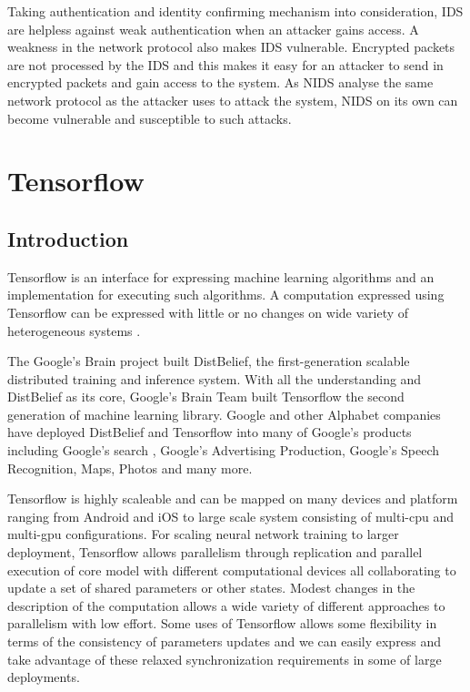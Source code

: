 \documentclass[12pt, a4paper]{report}
\begin{document}
Taking authentication and identity confirming mechanism into consideration, IDS are helpless against weak authentication when an attacker gains access. A weakness in the network protocol also makes IDS vulnerable. Encrypted packets are not processed by the IDS and this makes it easy for an attacker to send in encrypted packets and gain access to the system. As NIDS analyse the same network protocol as the attacker uses to attack the system, NIDS on its own can become vulnerable and susceptible to such attacks. \cite{limitationOfIDS}
\clearpage



\chapter{Tensorflow}\label{sec:tensorflow}

\section{Introduction}\label{sec:tensor_intro}
\justify
Tensorflow is an interface for expressing machine learning algorithms and an implementation for executing such algorithms. A computation expressed using Tensorflow can be expressed with little or no changes on wide variety of heterogeneous systems \cite{tensorflow_paper}. \\ \par

The Google's Brain project built DistBelief, the first-generation scalable distributed training and inference system. With all the understanding and DistBelief as its core, Google's Brain Team built Tensorflow the second generation of machine learning library. Google and other Alphabet companies have deployed DistBelief and Tensorflow into many of Google's products including Google's search \cite{googleSearch}, Google's Advertising Production, Google's Speech Recognition, Maps, Photos and many more. \\ \par

Tensorflow is highly scaleable and can be mapped on many devices and platform ranging from Android and iOS to large scale system consisting of multi-cpu and multi-gpu configurations. For scaling neural network training to larger deployment, Tensorflow allows parallelism through replication and parallel execution of core model with different computational devices all collaborating to update a set of shared parameters or other states. Modest changes in the description of the computation allows a wide variety of different approaches to parallelism with low effort. Some uses of Tensorflow allows some flexibility in terms of the consistency of parameters updates and we can easily express and take advantage of these relaxed synchronization requirements in some of large deployments.\\ \par
\end{document}

